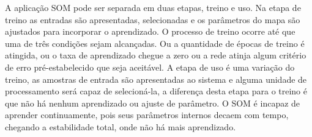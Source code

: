 A aplicação SOM pode ser separada em duas etapas, treino e uso. Na etapa de treino as entradas são apresentadas, selecionadas e os parâmetros do mapa são ajustados para incorporar o aprendizado. O processo de treino ocorre até que uma de três condições sejam alcançadas. Ou a quantidade de épocas de treino é atingida, ou o taxa de aprendizado chegue a zero ou a rede atinja algum critério de erro pré-estabelecido que seja aceitável. A etapa de uso é uma variação do treino, as amostras de entrada são apresentadas ao sistema e alguma unidade de processamento será capaz de selecioná-la, a diferença desta etapa para o treino é que não há nenhum aprendizado ou ajuste de parâmetro. O SOM é incapaz de aprender continuamente, pois seus parâmetros internos decaem com tempo, chegando a estabilidade total, onde não há mais aprendizado.

    




 











